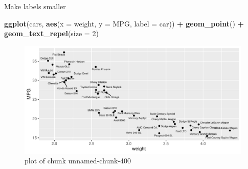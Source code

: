 \documentclass[
  ignorenonframetext,
]{beamer}
\newenvironment{Shaded}{\begin{snugshade}}{\end{snugshade}}
\newcommand{\DataTypeTok}[1]{\textcolor[rgb]{0.13,0.29,0.53}{#1}}
\newcommand{\DecValTok}[1]{\textcolor[rgb]{0.00,0.00,0.81}{#1}}
\newcommand{\KeywordTok}[1]{\textcolor[rgb]{0.13,0.29,0.53}{\textbf{#1}}}
\newcommand{\NormalTok}[1]{#1}
\newcommand{\OperatorTok}[1]{\textcolor[rgb]{0.81,0.36,0.00}{\textbf{#1}}}
\newcommand{\StringTok}[1]{\textcolor[rgb]{0.31,0.60,0.02}{#1}}
\begin{document}
\begin{frame}[fragile]{Make labels smaller}
\protect\hypertarget{make-labels-smaller}{}

\begin{Shaded}
\begin{Highlighting}[]
\KeywordTok{ggplot}\NormalTok{(cars, }\KeywordTok{aes}\NormalTok{(}\DataTypeTok{x =}\NormalTok{ weight, }\DataTypeTok{y =}\NormalTok{ MPG, }\DataTypeTok{label =}\NormalTok{ car)) }\OperatorTok{+}
\StringTok{  }\KeywordTok{geom_point}\NormalTok{() }\OperatorTok{+}\StringTok{ }\KeywordTok{geom_text_repel}\NormalTok{(}\DataTypeTok{size =} \DecValTok{2}\NormalTok{)}
\end{Highlighting}
\end{Shaded}

\begin{figure}
\centering
\includegraphics{figure/unnamed-chunk-400-1.pdf}
\caption{plot of chunk unnamed-chunk-400}
\end{figure}

\end{frame}
\end{document}
